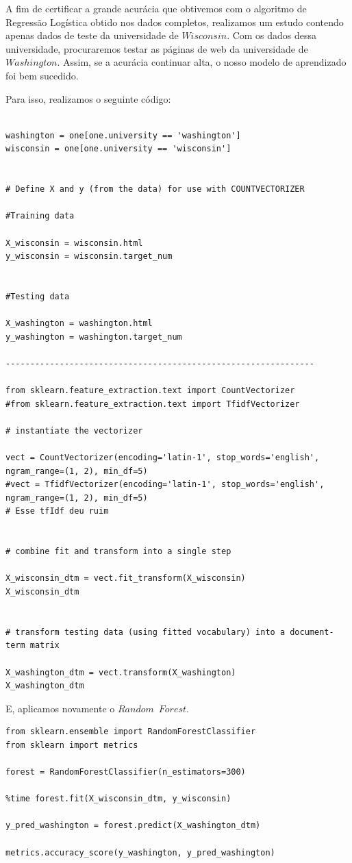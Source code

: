 \documentclass [12pt, a4paper] {article}
\begin{document}
A fim de certificar a grande acurácia que obtivemos com o algoritmo de Regressão Logística obtido nos dados completos, realizamos um estudo contendo apenas dados de teste da universidade de $Wisconsin$. Com os dados dessa universidade, procuraremos testar as páginas de web da universidade de $Washington$. Assim, se a acurácia continuar alta, o nosso modelo de aprendizado foi bem sucedido.

Para isso, realizamos o seguinte código:

\begin{lstlisting}

washington = one[one.university == 'washington']
wisconsin = one[one.university == 'wisconsin']


# Define X and y (from the data) for use with COUNTVECTORIZER

#Training data

X_wisconsin = wisconsin.html
y_wisconsin = wisconsin.target_num


#Testing data

X_washington = washington.html
y_washington = washington.target_num

---------------------------------------------------------------

from sklearn.feature_extraction.text import CountVectorizer
#from sklearn.feature_extraction.text import TfidfVectorizer

# instantiate the vectorizer

vect = CountVectorizer(encoding='latin-1', stop_words='english', ngram_range=(1, 2), min_df=5)
#vect = TfidfVectorizer(encoding='latin-1', stop_words='english', ngram_range=(1, 2), min_df=5)
# Esse tfIdf deu ruim

                       
# combine fit and transform into a single step

X_wisconsin_dtm = vect.fit_transform(X_wisconsin)
X_wisconsin_dtm


# transform testing data (using fitted vocabulary) into a document-term matrix

X_washington_dtm = vect.transform(X_washington)
X_washington_dtm

\end{lstlisting}

E, aplicamos novamente o $Random \;\ Forest$.

\begin{lstlisting}
from sklearn.ensemble import RandomForestClassifier
from sklearn import metrics

forest = RandomForestClassifier(n_estimators=300)

%time forest.fit(X_wisconsin_dtm, y_wisconsin)

y_pred_washington = forest.predict(X_washington_dtm)

metrics.accuracy_score(y_washington, y_pred_washington)
\end{lstlisting}
\end{document}
